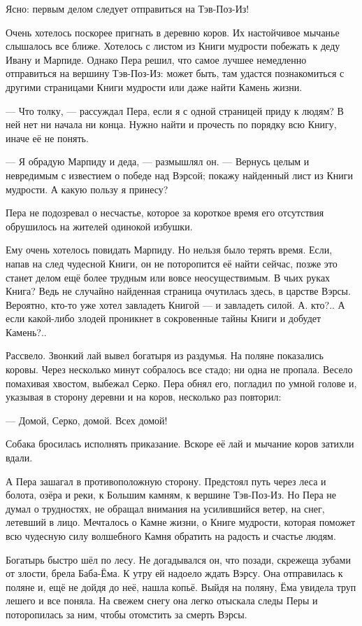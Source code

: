 \documentclass[12pt, a4paper, openany]{book}
\begin{document}
	
	
	
	Ясно: первым делом следует отправиться на Тэв-Поз-Из!
	
	Очень хотелось поскорее пригнать в деревню коров. Их настойчивое мычанье слышалось все ближе. Хотелось с листом из Книги мудрости побежать к деду Ивану и Марпиде. Однако Пера решил, что самое лучшее немедленно отправиться на вершину Тэв-Поз-Из: может быть, там удастся познакомиться с другими страницами Книги мудрости или даже найти Камень жизни.
	
	— Что толку, — рассуждал Пера, если я с одной страницей приду к людям? В ней нет ни начала ни конца. Нужно найти и прочесть по порядку всю Книгу, иначе её не понять.
	
	— Я обрадую Марпиду и деда, — размышлял он. — Вернусь целым и невредимым с известием о победе над Вэрсой; покажу найденный лист из Книги мудрости. А какую пользу я принесу?
	
	Пера не подозревал о несчастье, которое за короткое время его отсутствия обрушилось на жителей одинокой избушки.
	
	Ему очень хотелось повидать Марпиду. Но нельзя было терять время. Если, напав на след чудесной Книги, он не поторопится её найти сейчас, позже это станет делом ещё более трудным или вовсе неосуществимым. В чьих руках Книга? Ведь не случайно найденная страница очутилась здесь, в царстве Вэрсы. Вероятно, кто-то уже хотел завладеть Книгой — и завладеть силой. А. кто?.. А если какой-либо злодей проникнет в сокровенные тайны Книги и добудет Камень?..
	
	Рассвело. Звонкий лай вывел богатыря из раздумья. На поляне показались коровы. Через несколько минут собралось все стадо; ни одна не пропала. Весело помахивая хвостом, выбежал Серко. Пера обнял его, погладил по умной голове и, указывая в сторону деревни и на коров, несколько раз повторил:
	
	— Домой, Серко, домой. Всех домой!
	
	Собака бросилась исполнять приказание. Вскоре её лай и мычание коров затихли вдали.
	
	А Пера зашагал в противоположную сторону. Предстоял путь через леса и болота, озёра и реки, к Большим камням, к вершине Тэв-Поз-Из. Но Пера не думал о трудностях, не обращал внимания на усилившийся ветер, на снег, летевший в лицо. Мечталось о Камне жизни, о Книге мудрости, которая поможет всю чудесную силу волшебного Камня обратить на радость и счастье людям.
	
	Богатырь быстро шёл по лесу. Не догадывался он, что позади, скрежеща зубами от злости, брела Баба-Ёма. К утру ей надоело ждать Вэрсу. Она отправилась к поляне и, ещё не дойдя до неё, нашла копьё. Выйдя на поляну, Ёма увидела труп лешего и все поняла. На свежем снегу она легко отыскала следы Перы и поторопилась за ним, чтобы отомстить за смерть Вэрсы.
	
\end{document}
